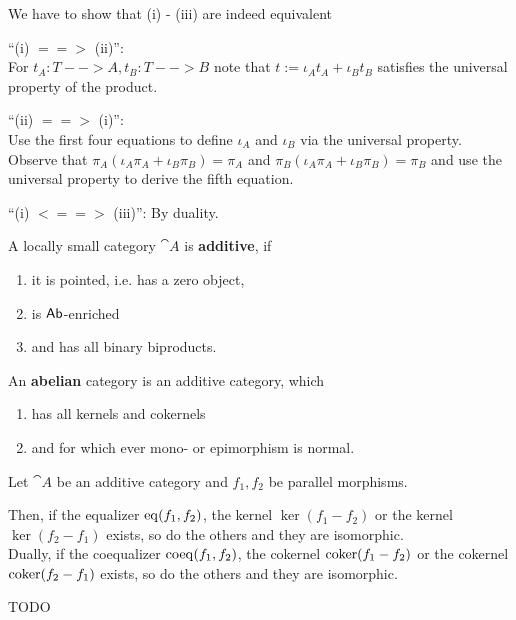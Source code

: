 	We have to show that (i) - (iii) are indeed equivalent
	\begin{sketch}
		\enquote{(i) $==>$ (ii)}:\\
		For $t_A:T-->A,t_B:T-->B$ note that $t := \iota_At_A + \iota_Bt_B$ satisfies the universal property of the product.

		\enquote{(ii) $==>$ (i)}:\\
		Use the first four equations to define $\iota_A$ and $\iota_B$ via the universal property. Observe that $\pi_A(\iota_A\pi_A + \iota_B\pi_B) = \pi_A$ and $\pi_B(\iota_A\pi_A + \iota_B\pi_B) = \pi_B$ and use the universal property to derive the fifth equation.

		\enquote{(i) $<==>$ (iii)}: By duality.
	\end{sketch}

	\begin{definition}
		A locally small category $\cat{A}$ is \textbf{additive}, if
		\begin{enumerate}[$\circ$]
			\item{it is pointed, i.e. has a zero object,}
			\item{is $\textsf{Ab}$-enriched}
			\item{and has all binary biproducts.}
		\end{enumerate}

		An \textbf{abelian} category is an additive category, which
		\begin{enumerate}[$\circ$]
			\item{has all kernels and cokernels}
			\item{and for which ever mono- or epimorphism is normal.}
		\end{enumerate}
	\end{definition}

	\begin{proposition}
		Let $\cat{A}$ be an additive category and $f_1,f_2$ be parallel morphisms.

		Then, if the equalizer $\operatorname{eq}(f_1,f_2)$, the kernel $\ker(f_1-f_2)$ or the kernel $\ker(f_2-f_1)$ exists, so do the others and they are isomorphic.\\
		Dually, if the coequalizer $\operatorname{coeq}(f_1,f_2)$, the cokernel $\operatorname{coker}(f_1-f_2)$ or the cokernel $\operatorname{coker}(f_2-f_1)$ exists, so do the others and they are isomorphic.
	\end{proposition}
	\begin{sketch}
		TODO
	\end{sketch}

